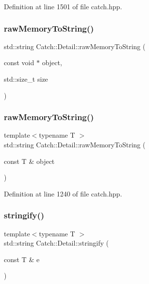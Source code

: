 Definition at line 1501 of file catch.\+hpp.

\mbox{\label{namespace_catch_1_1_detail_ac5d6c510e565ee5bddcc2236194ce29e}} 
\subsubsection{rawMemoryToString()\hspace{0.1cm}{\footnotesize\ttfamily [1/2]}}
{\footnotesize\ttfamily std\+::string Catch\+::\+Detail\+::raw\+Memory\+To\+String (\begin{DoxyParamCaption}\item[{const void $\ast$}]{object,  }\item[{std\+::size\+\_\+t}]{size }\end{DoxyParamCaption})}

\mbox{\label{namespace_catch_1_1_detail_a371620ed524abfcae5c3772bf49b563a}} 
\subsubsection{rawMemoryToString()\hspace{0.1cm}{\footnotesize\ttfamily [2/2]}}
{\footnotesize\ttfamily template$<$typename T $>$ \\
std\+::string Catch\+::\+Detail\+::raw\+Memory\+To\+String (\begin{DoxyParamCaption}\item[{const T \&}]{object }\end{DoxyParamCaption})}



Definition at line 1240 of file catch.\+hpp.

\mbox{\label{namespace_catch_1_1_detail_af0ad48344ffd3f92f3568465248a9880}} 
\subsubsection{stringify()}
{\footnotesize\ttfamily template$<$typename T $>$ \\
std\+::string Catch\+::\+Detail\+::stringify (\begin{DoxyParamCaption}\item[{const T \&}]{e }\end{DoxyParamCaption})}




